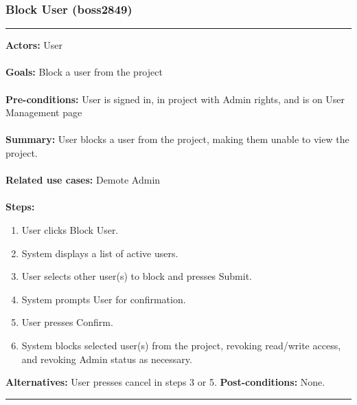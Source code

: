 \documentclass[11pt]{report}
\begin{document}
\subsubsection{Block User (boss2849)}
\vspace{2pt}
\hrule
\vspace{8pt}
 \textbf{Actors:} User \\ \\
\textbf{Goals:} Block a user from the project \\ \\
 \textbf{Pre-conditions:} User is signed in, in project with Admin rights, and is on User Management page \\ \\
 \textbf{Summary:} User blocks a user from the project, making them unable to view the project. \\ \\
\textbf{Related use cases:} Demote Admin \\ \\
\textbf{Steps:} \begin{enumerate}
  \item User clicks Block User.
  \item System displays a list of active users.
  \item User selects other user(s) to block and presses Submit.
  \item System prompts User for confirmation.
  \item User presses Confirm.
  \item System blocks selected user(s) from the project, revoking read/write access, and revoking Admin status as necessary.
 \end{enumerate}
 \textbf{Alternatives:} User presses cancel in steps 3 or 5.
 \textbf{Post-conditions:} None. \\
\vspace{8pt}
\hrule
\end{document}
